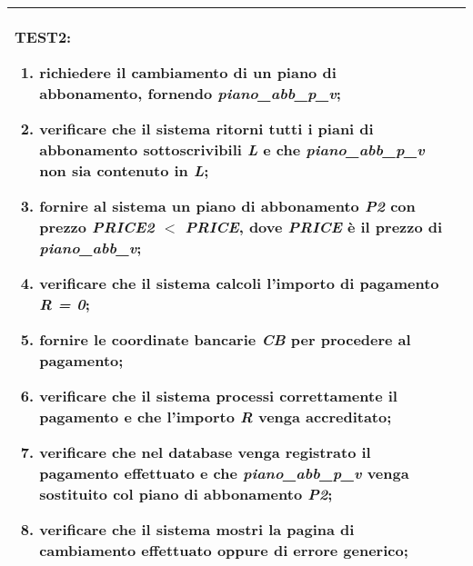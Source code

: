 \begin{table}[hb]
\begin{tabular}{ |p{2cm}|p{10cm}|  }
\begin{enumerate}[nosep, topsep=0pt]
        \end{enumerate}
        \vspace{0.5cm} TEST2:
        \begin{enumerate}[nosep, topsep=0pt]
            \item richiedere il cambiamento di un piano di abbonamento, fornendo \emph{piano\_abb\_p\_v};
            \item verificare che il sistema ritorni tutti i piani di abbonamento sottoscrivibili \emph{L} e che \emph{piano\_abb\_p\_v} non sia contenuto in \emph{L};
            \item fornire al sistema un piano di abbonamento \emph{P2} con prezzo \emph{PRICE2} $<$ \emph{PRICE}, dove \emph{PRICE} è il prezzo di \emph{piano\_abb\_v};
            \item verificare che il sistema calcoli l'importo di pagamento \emph{R = 0};
            \item fornire le coordinate bancarie \emph{CB} per procedere al pagamento;
            \item verificare che il sistema processi correttamente il pagamento e che l'importo \emph{R} venga accreditato;
            \item verificare che nel database venga registrato il pagamento effettuato e che \emph{piano\_abb\_p\_v} venga sostituito col piano di abbonamento \emph{P2};
            \item verificare che il sistema mostri la pagina di cambiamento effettuato oppure di errore generico;
        \end{enumerate}
        \\\hline
    \end{tabular}
\end{table}

